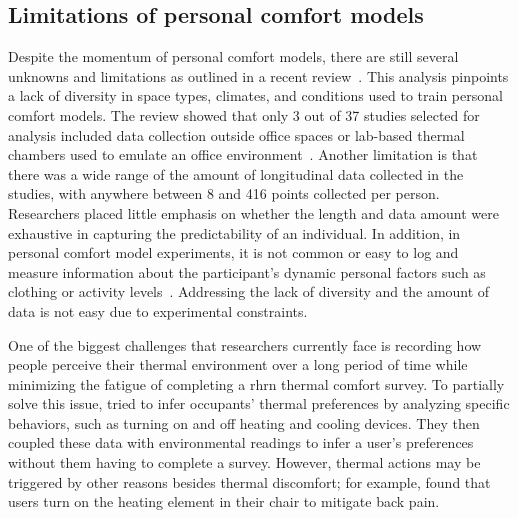 \subsection{Limitations of personal comfort models}\label{subsec:limitations_pcm}
Despite the momentum of personal comfort models, there are still several unknowns and limitations as outlined in a recent review~\cite{ArakawaMartins2022}.
This analysis pinpoints a lack of diversity in space types, climates, and conditions used to train personal comfort models.
The review showed that only 3 out of 37 studies selected for analysis included data collection outside office spaces or lab-based thermal chambers used to emulate an office environment~\cite{ArakawaMartins2022}.
Another limitation is that there was a wide range of the amount of longitudinal data collected in the studies, with anywhere between 8 and 416 points collected per person.
Researchers placed little emphasis on whether the length and data amount were exhaustive in capturing the predictability of an individual.
In addition, in personal comfort model experiments, it is not common or easy to log and measure information about the participant's dynamic personal factors such as clothing or activity levels~\cite{Ngarambe2019-aw}.
Addressing the lack of diversity and the amount of data is not easy due to experimental constraints.

One of the biggest challenges that researchers currently face is recording how people perceive their thermal environment over a long period of time while minimizing the fatigue of completing a \ac{rhrn} thermal comfort survey.
To partially solve this issue, \textcite{Kim2018} tried to infer occupants' thermal preferences by analyzing specific behaviors, such as turning on and off heating and cooling devices.
They then coupled these data with environmental readings to infer a user's preferences without them having to complete a survey.
However, thermal actions may be triggered by other reasons besides thermal discomfort;
for example, \textcite{Kim2018} found that users turn on the heating element in their chair to mitigate back pain.

